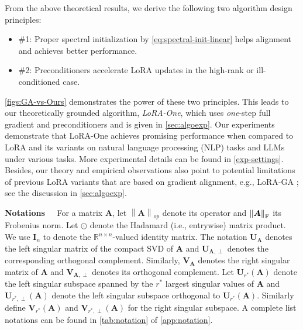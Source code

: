 From the above theoretical results, we derive the following two algorithm design principles: 
\begin{itemize}
    \item \#1: Proper spectral initialization by \eqref{eq:spectral-init-linear} helps alignment and achieves better performance.
    \item \#2: Preconditioners accelerate LoRA updates in the high-rank or ill-conditioned case.
\end{itemize}
\cref{figs:GA-vs-Ours} demonstrates the power of these two principles.
This leads to our theoretically grounded algorithm, \emph{LoRA-One}, which uses \emph{one}-step full gradient and preconditioners and is given in \cref{sec:algoexp}.
Our experiments demonstrate that LoRA-One achieves promising performance when compared to LoRA and its variants on natural language processing (NLP) tasks and LLMs under various tasks.
More experimental details can be found in \cref{exp-settings}. Besides, our theory and empirical observations also point to potential limitations of previous LoRA variants that are based on gradient alignment, e.g., LoRA-GA \citep{wang2024lora}; see the discussion in \cref{sec:algoexp}.


\noindent
\textbf{Notations~~} For a matrix $\bm A$, let $\left\|\bm A\right\|_{op}$ denote its operator and $\left\|\bm A\right\|_{\rm F}$ its Frobenius norm. Let $\odot$ denote the Hadamard (i.e., entrywise) matrix product. We use $\bm I_n$ to denote the $\mathbb{R}^{n\times n}$-valued identity matrix.
The notation $\bm U_{\bm A}$ denotes the left singular matrix of the compact SVD of $\bm A$ and $\bm U_{\bm A, \perp}$ denotes the corresponding orthogonal complement. Similarly, $\bm V_{\bm A}$ denotes the right singular matrix of $\bm A$ and $\bm V_{\bm A, \perp}$ denotes its orthogonal complement. Let $\bm U_{r^*}(\bm A)$ denote the left singular subspace spanned by the $r^*$ largest singular values of $\bm A$ and $\bm U_{r^*,\perp}(\bm A)$ denote the left singular subspace orthogonal to $\bm U_{r^*}\left(\bm{A}\right)$. Similarly define $\bm V_{r^*}(\bm A)$ and $\bm V_{r^*,\perp}(\bm A)$ for the right singular subspace.
A complete list notations can be found in \cref{tab:notation} of \cref{app:notation}.
